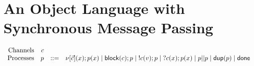 \documentclass{amsbook}
\theoremstyle{definition}
\theoremstyle{remark}
\numberwithin{section}{chapter}
\numberwithin{equation}{chapter}
\begin{document}
\section{An Object Language with Synchronous Message Passing}

\newcommand{\newp}[3]{\nu[#1](#2); #3}
\newcommand{\block}[2]{\mt{block}(#1); #2}
\newcommand{\send}[3]{!#1(#2); #3}
\newcommand{\recv}[3]{?#1(#2); #3}
\newcommand{\parl}[2]{#1 || #2}
\newcommand{\dup}[1]{\mt{dup}(#1)}
\newcommand{\done}[0]{\mt{done}}

$$\begin{array}{rrcl}
  \textrm{Channels} & c \\
  \textrm{Processes} & p &::=& \newp{\vec{c}}{x}{p(x)} \mid \block{c}{p} \mid \; \send{c}{v}{p} \mid \; \recv{c}{x}{p(x)} \mid \parl{p}{p} \mid \dup{p} \mid \done
\end{array}$$
\end{document}
